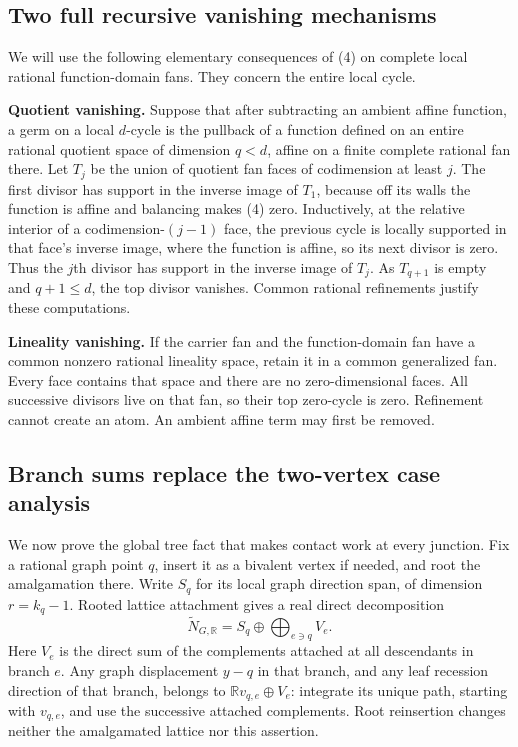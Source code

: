 \documentclass[
  11pt,
]{article}
\begin{document}
\subsection{Two full recursive vanishing
mechanisms}\label{two-full-recursive-vanishing-mechanisms}

We will use the following elementary consequences of (4) on complete
local rational function-domain fans. They concern the entire local
cycle.

\textbf{Quotient vanishing.} Suppose that after subtracting an ambient
affine function, a germ on a local \(d\)-cycle is the pullback of a
function defined on an entire rational quotient space of dimension
\(q<d\), affine on a finite complete rational fan there. Let \(T_j\) be
the union of quotient fan faces of codimension at least \(j\). The first
divisor has support in the inverse image of \(T_1\), because off its
walls the function is affine and balancing makes (4) zero. Inductively,
at the relative interior of a codimension-\((j-1)\) face, the previous
cycle is locally supported in that face's inverse image, where the
function is affine, so its next divisor is zero. Thus the \(j\)th
divisor has support in the inverse image of \(T_j\). As \(T_{q+1}\) is
empty and \(q+1\leq d\), the top divisor vanishes. Common rational
refinements justify these computations.

\textbf{Lineality vanishing.} If the carrier fan and the function-domain
fan have a common nonzero rational lineality space, retain it in a
common generalized fan. Every face contains that space and there are no
zero-dimensional faces. All successive divisors live on that fan, so
their top zero-cycle is zero. Refinement cannot create an atom. An
ambient affine term may first be removed.

\subsection{Branch sums replace the two-vertex case
analysis}\label{branch-sums-replace-the-two-vertex-case-analysis}

We now prove the global tree fact that makes contact work at every
junction. Fix a rational graph point \(q\), insert it as a bivalent
vertex if needed, and root the amalgamation there. Write \(S_q\) for its
local graph direction span, of dimension \(r=k_q-1\). Rooted lattice
attachment gives a real direct decomposition
\[\widetilde N_{G,\mathbb R}=S_q\oplus\bigoplus_{e\ni q}V_e. \tag{15}\]
Here \(V_e\) is the direct sum of the complements attached at all
descendants in branch \(e\). Any graph displacement \(y-q\) in that
branch, and any leaf recession direction of that branch, belongs to
\(\mathbb Rv_{q,e}\oplus V_e\): integrate its unique path, starting with
\(v_{q,e}\), and use the successive attached complements. Root
reinsertion changes neither the amalgamated lattice nor this assertion.
\end{document}
